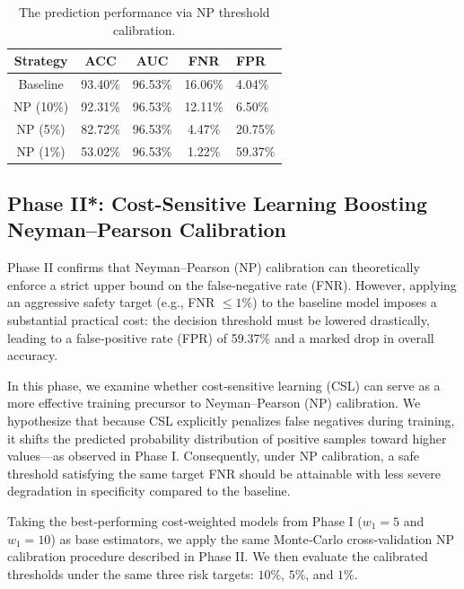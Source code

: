 \documentclass[sigconf,review,anonymous]{acmart}
\theoremstyle{remark}
\begin{document}
\begin{table}[htbp]
    \caption{The prediction performance via NP threshold calibration.}
    \label{tab:table3}     
    \begin{tabular}{ccccl}            
        \toprule
        Strategy & ACC & AUC & FNR & FPR \\
        \midrule
        Baseline & 93.40\% & 96.53\% & 16.06\% & 4.04\% \\
        \midrule
        NP (10\%) & 92.31\% & 96.53\% & 12.11\% & 6.50\% \\
        NP (5\%)  & 82.72\% & 96.53\% & 4.47\% & 20.75\% \\
        NP (1\%)  & 53.02\% & 96.53\% & 1.22\% & 59.37\% \\
        \bottomrule
    \end{tabular}
    \vskip -0.2in
\end{table}


\subsection{Phase II*: Cost-Sensitive Learning Boosting Neyman–Pearson Calibration}

Phase II confirms that Neyman–Pearson (NP) calibration can theoretically enforce a strict upper bound on the false‑negative rate (FNR). However, applying an aggressive safety target (e.g., FNR $\leq 1\%$) to the baseline model imposes a substantial practical cost: the decision threshold must be lowered drastically, leading to a false‑positive rate (FPR) of 59.37\% and a marked drop in overall accuracy.

In this phase, we examine whether cost‑sensitive learning (CSL) can serve as a more effective training precursor to Neyman–Pearson (NP) calibration. We hypothesize that because CSL explicitly penalizes false negatives during training, it shifts the predicted probability distribution of positive samples toward higher values—as observed in Phase I. Consequently, under NP calibration, a safe threshold satisfying the same target FNR should be attainable with less severe degradation in specificity compared to the baseline.

Taking the best‑performing cost‑weighted models from Phase I (\(w_{1}=5\) and \(w_{1}=10\)) as base estimators, we apply the same Monte‑Carlo cross‑validation NP calibration procedure described in Phase II. We then evaluate the calibrated thresholds under the same three risk targets: \(10\%\), \(5\%\), and \(1\%\).
\end{document}

